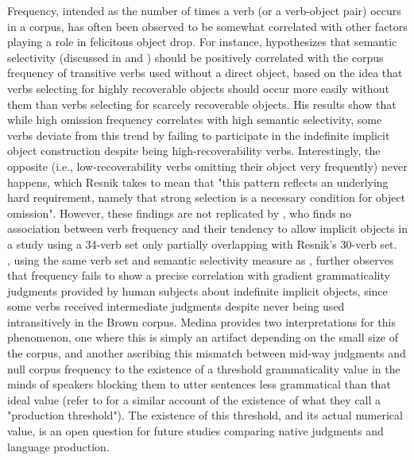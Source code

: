 Frequency, intended as the number of times a verb (or a verb-object pair) occurs in a corpus, has often been observed to be somewhat correlated with other factors playing a role in felicitous object drop. For instance, \textcite[149-151]{Resnik1996} hypothesizes that semantic selectivity (discussed in  and ) should be positively correlated with the corpus frequency of transitive verbs used without a direct object, based on the idea that verbs selecting for highly recoverable objects should occur more easily without them than verbs selecting for scarcely recoverable objects. His results show that while high omission frequency correlates with high semantic selectivity, some verbs deviate from this trend by failing to participate in the indefinite implicit object construction despite being high-recoverability verbs. Interestingly, the opposite (i.e., low-recoverability verbs omitting their object very frequently) never happens, which Resnik takes to mean that "this pattern reflects an underlying hard requirement, namely that strong selection is a necessary condition for object omission". However, these findings are not replicated by \textcite[441]{ruppenhofer2004interaction}, who finds no association between verb frequency and their tendency to allow implicit objects in a study using a 34-verb set only partially overlapping with Resnik's 30-verb set.\\
\textcite[165]{Medina2007}, using the same verb set and semantic selectivity measure as \textcite{Resnik1996}, further observes that frequency fails to show a precise correlation with gradient grammaticality judgments provided by human subjects about indefinite implicit objects, since some verbs received intermediate judgments despite never being used intransitively in the Brown corpus. Medina provides two interpretations for this phenomenon, one where this is simply an artifact depending on the small size of the corpus, and another ascribing this mismatch between mid-way judgments and null corpus frequency to the existence of a threshold grammaticality value in the minds of speakers blocking them to utter sentences less grammatical than that ideal value (refer to \textcite{KempenHarbusch2005} for a similar account of the existence of what they call a "production threshold"). The existence of this threshold, and its actual numerical value, is an open question for future studies comparing native judgments and language production.\\
